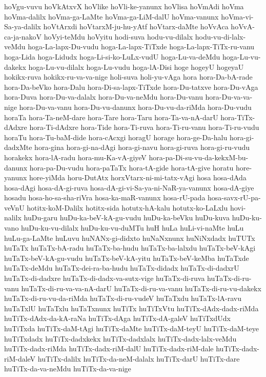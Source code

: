 {hoVgu-vuvu
hoVkAtxvX
hoVlike
hoVli-ke-yanunx
hoVlisa
hoVmAdi
hoVma
hoVma-dalilx
hoVma-ga-LaMte
hoVma-ga-LiM-dalU
hoVma-vanunx
hoVma-vi-Sa-ya-dalilx
hoVtArxdi
hoVtarxM-ju-hu-yAtf
hoVtarx-daMte
hoVvAca
hoVvA-ca-ja-nakoV
hoVyi-teMdu
hoVyitu
hodi-suva
hodu-vu-dilalx
hodu-vu-di-lalx-veMdu
hoga-La-lapx-Du-vudu
hoga-La-lapx-TiTxde
hoga-La-lapx-TiTx-ru-vanu
hoga-Lida
hoga-Lidudx
hoga-Li-si-ko-LuLx-vudU
hoga-Lu-va-deMdu
hoga-Lu-vu-dakekx
hoga-Lu-vu-dilalx
hoga-Lu-vudu
hoga-lA-Disi
hoge
hogeyU
hogeyaU
hokikx-ruva
hokikx-ru-va-va-nige
holi-suva
holi-yu-vAga
hora
hora-Da-bA-rade
hora-Da-beVko
hora-Dalu
hora-Di-sa-lapx-TiTxde
hora-Du-tatxve
hora-Du-vAga
hora-Duva
hora-Du-va-dalalx
hora-Du-va-neMdu
hora-Du-vanu
hora-Du-va-va-nige
hora-Du-va-vanu
hora-Du-vu-danunx
hora-Du-vu-da-riMda
hora-Du-vudu
horaTa
hora-Ta-neM-dare
hora-Tare
hora-Taru
hora-Ta-va-nA-darU
hora-TiTx-dAdxre
hora-Ti-dAdxre
hora-Tide
hora-Ti-ruva
hora-Ti-ru-vanu
hora-Ti-ru-vudu
horaTu
hora-Tu-baM-dide
hora-cAcxgi
horagU
horage
hora-ge-Da-halu
hora-gi-dadxMte
hora-gina
hora-gi-na-dAgi
hora-gi-navu
hora-gi-ruva
hora-gi-ru-vudu
horakekx
hora-lA-radu
hora-mu-Ka-vA-giyeV
hora-pa-Di-su-vu-da-kekxM-bu-danunx
hora-pa-Du-vudu
hora-paTaTx
hora-tA-gide
hora-tA-give
horatu
hore-yanunx
hore-yiMda
horu-DutAtx
horxVtarx-ni-mi-tatx-vAgi
hosa
hosa-dAda
hosa-dAgi
hosa-dA-gi-ruva
hosa-dA-gi-vi-Sa-ya-ni-NaR-ya-vanunx
hosa-dA-giye
hosadu
hosa-ho-sa-sha-riVra
hosa-ka-maR-vanunx
hosa-rU-pada
hosa-savx-rU-pa-veVnU
hotitx-koM-Dalilx
hotitx-sida
hotutx-hA-kalu
hotutx-ko-LaLxlu
hovi-nalilx
huDu-garu
huDu-ka-beV-kA-gu-vudu
huDu-ka-beVku
huDu-kuva
huDu-ku-vano
huDu-ku-vu-dilalx
huDu-ku-vu-duMTu
huH
huLa
huLi-vi-naMte
huLu
huLu-ga-LaMte
huLuvu
huNANx-gi-didxto
huNaNxnunx
huNiNxdadx
huTUTx
huTaTx
huTaTx-bA-radu
huTaTx-ba-hudu
huTaTx-ba-lalxdu
huTaTx-beV-kAgi
huTaTx-beV-kA-gu-vudu
huTaTx-beV-kA-yitu
huTaTx-beV-keMba
huTaTxde
huTaTx-deMdu
huTaTx-dei-ra-ba-hudu
huTaTx-didadx
huTaTx-di-dadxrU
huTaTx-di-dadxre
huTaTx-di-dadx-va-sutx-vige
huTaTx-di-ruva
huTaTx-di-ru-vanu
huTaTx-di-ru-va-va-nA-darU
huTaTx-di-ru-va-vanu
huTaTx-di-ru-vu-dakekx
huTaTx-di-ru-vu-da-riMda
huTaTx-di-ru-vudeV
huTaTxdu
huTaTx-lA-ravu
huTaTxlU
huTaTxlu
huTaTxnunx
huTiTx
huTiTxVtu
huTiTx-dAdx-dadx-riMda
huTiTx-dAdx-da-kA-raNa
huTiTx-dAga
huTiTx-dA-galeV
huTiTxdUdx
huTiTxda
huTiTx-daM-tAgi
huTiTx-daMte
huTiTx-daM-teyU
huTiTx-daM-teye
huTiTxdadx
huTiTx-dadxkekx
huTiTx-dadxlalx
huTiTx-dadx-lalx-veMdu
huTiTx-dadx-riMda
huTiTx-dadx-riM-dalU
huTiTx-dadx-riM-dale
huTiTx-dadx-riM-daleV
huTiTx-dalilx
huTiTx-da-neM-dalalx
huTiTx-darU
huTiTx-dare
huTiTx-da-va-neMdu
huTiTx-da-va-nige
}
